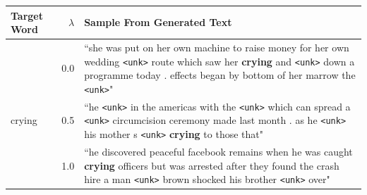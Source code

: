 \documentclass[11pt,a4paper]{article}
\begin{document}
\begin{table}[t]
\small
\centering
    \begin{tabularx}{\linewidth}{lrX}
     \toprule
      
      \textbf{Target Word} &
    \textbf{$\lambda$}  & \textbf{Sample From Generated Text }\\
    \midrule
 \hfil   & 0.0 &``she was put on her own machine to raise money for her own wedding
\verb+<unk>+ route which saw her \textbf{crying} and \verb+<unk>+ down a programme today . effects began by bottom of her
marrow the \verb+<unk>+"\\
     crying& 0.5 & ``he \verb+<unk>+ in the americas with the \verb+<unk>+
which can spread a \verb+<unk>+ circumcision ceremony made last month . as he \verb+<unk>+ his mother s \verb+<unk>+ \textbf{crying} to
those that"
\\
     & 1.0 &``he discovered peaceful facebook remains when he was caught \textbf{crying} officers but was arrested after they found the
crash hire a man \verb+<unk>+ brown shocked his brother \verb+<unk>+ over"\\
\midrule


\end{tabularx}
\end{table}
\end{document}
